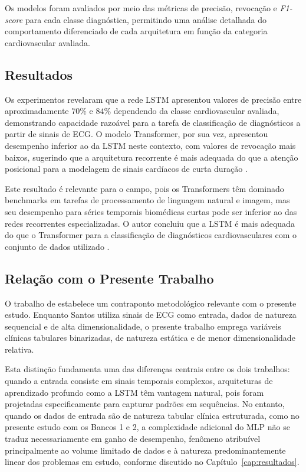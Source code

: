 Os modelos foram avaliados por meio das m\'etricas de precis\~ao, revoca\c c\~ao e \textit{F1-score} para cada classe diagn\'ostica, permitindo uma an\'alise detalhada do comportamento diferenciado de cada arquitetura em fun\c c\~ao da categoria cardiovascular avaliada.

\subsection{Resultados}

Os experimentos revelaram que a rede LSTM apresentou valores de precis\~ao entre aproximadamente $70\%$ e $84\%$ dependendo da classe cardiovascular avaliada, demonstrando capacidade razo\'avel para a tarefa de classifica\c c\~ao de diagn\'osticos a partir de sinais de ECG. O modelo Transformer, por sua vez, apresentou desempenho inferior ao da LSTM neste contexto, com valores de revoca\c c\~ao mais baixos, sugerindo que a arquitetura recorrente \'e mais adequada do que a aten\c c\~ao posicional para a modelagem de sinais cardíacos de curta dura\c c\~ao \cite{santos2023}.

Este resultado \'e relevante para o campo, pois os Transformers t\^em dominado benchmarks em tarefas de processamento de linguagem natural e imagem, mas seu desempenho para s\'eries temporais biom\'edicas curtas pode ser inferior ao das redes recorrentes especializadas. O autor concluiu que a LSTM \'e mais adequada do que o Transformer para a classifica\c c\~ao de diagn\'osticos cardiovasculares com o conjunto de dados utilizado \cite{santos2023}.

\subsection{Rela\c c\~ao com o Presente Trabalho}

O trabalho de  estabelece um contraponto metodol\'ogico relevante com o presente estudo. Enquanto Santos utiliza sinais de ECG como entrada, dados de natureza sequencial e de alta dimensionalidade, o presente trabalho emprega vari\'aveis cl\'inicas tabulares binarizadas, de natureza est\'atica e de menor dimensionalidade relativa.

Esta distin\c c\~ao fundamenta uma das diferen\c cas centrais entre os dois trabalhos: quando a entrada consiste em sinais temporais complexos, arquiteturas de aprendizado profundo como a LSTM t\^em vantagem natural, pois foram projetadas especificamente para capturar padr\~oes em sequ\^encias. No entanto, quando os dados de entrada s\~ao de natureza tabular cl\'inica estruturada, como no presente estudo com os Bancos 1 e 2, a complexidade adicional do MLP n\~ao se traduz necessariamente em ganho de desempenho, fen\^omeno atribu\'ivel principalmente ao volume limitado de dados e \`a natureza predominantemente linear dos problemas em estudo, conforme discutido no Cap\'itulo~\ref{cap:resultados}.

